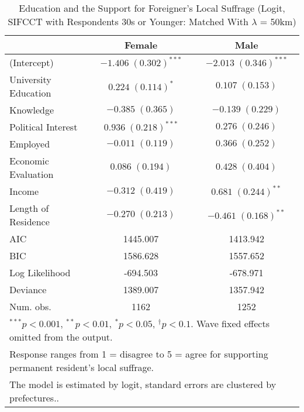 
\begin{table}
\caption{Education and the Support for Foreigner's Local Suffrage (Logit, SIFCCT with Respondents 30s or Younger: Matched With $\lambda$ = 50km)}
\begin{center}
\begin{tabular}{l c c }
\toprule
 & Female & Male \\
\midrule
(Intercept)          & $-1.406 \; (0.302)^{***}$ & $-2.013 \; (0.346)^{***}$ \\
University Education & $0.224 \; (0.114)^{*}$    & $0.107 \; (0.153)$        \\
Knowledge            & $-0.385 \; (0.365)$       & $-0.139 \; (0.229)$       \\
Political Interest   & $0.936 \; (0.218)^{***}$  & $0.276 \; (0.246)$        \\
Employed             & $-0.011 \; (0.119)$       & $0.366 \; (0.252)$        \\
Economic Evaluation  & $0.086 \; (0.194)$        & $0.428 \; (0.404)$        \\
Income               & $-0.312 \; (0.419)$       & $0.681 \; (0.244)^{**}$   \\
Length of Residence  & $-0.270 \; (0.213)$       & $-0.461 \; (0.168)^{**}$  \\
\midrule
AIC                  & 1445.007                  & 1413.942                  \\
BIC                  & 1586.628                  & 1557.652                  \\
Log Likelihood       & -694.503                  & -678.971                  \\
Deviance             & 1389.007                  & 1357.942                  \\
Num. obs.            & 1162                      & 1252                      \\
\bottomrule
\multicolumn{3}{l}{\scriptsize{$^{***}p<0.001$, $^{**}p<0.01$, $^*p<0.05$, $^{\dagger}p<0.1$. Wave fixed effects omitted from the output.}} \\ \multicolumn{3}{l}{\scriptsize{Response ranges from 1 = disagree to 5 = agree for supporting permanent resident's local suffrage.}} \\ \multicolumn{3}{l}{\scriptsize{The model is estimated by logit, standard errors are clustered by prefectures..}}
\end{tabular}
\label{lgtab_smo_m2}
\end{center}
\end{table}

